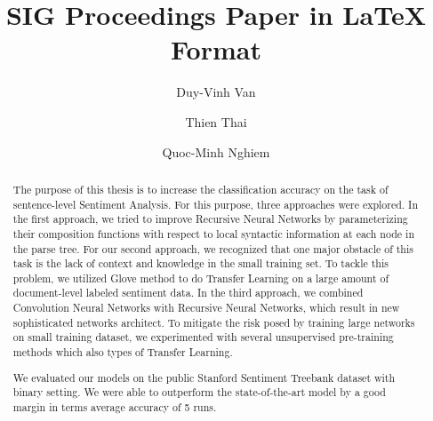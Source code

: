 \documentclass[sigconf]{acmart}
\begin{document}
\title{SIG Proceedings Paper in LaTeX Format}

\author{Duy-Vinh Van}

\author{Thien Thai}

\author{Quoc-Minh Nghiem}

\renewcommand{\shortauthors}{B. Trovato et al.}


\begin{abstract}
The purpose of this thesis is to increase the classification accuracy on the task of sentence-level Sentiment Analysis.
For this purpose, three approaches were explored.
In the first approach, we tried to improve Recursive Neural Networks by parameterizing their composition functions with respect to local syntactic information at each node in the parse tree.
For our second approach, we recognized that one major obstacle of this task is the lack of context and knowledge in the small training set.
To tackle this problem, we utilized Glove method to do Transfer Learning on a large amount of document-level labeled sentiment data.
In the third approach, we combined Convolution Neural Networks with Recursive Neural Networks, which result in new sophisticated networks architect.
To mitigate the risk posed by training large networks on small training dataset, we experimented with several unsupervised pre-training methods which also types of Transfer Learning.

We evaluated our models on the public Stanford Sentiment Treebank dataset with binary setting.
We were able to outperform the state-of-the-art model by a good margin in terms average accuracy of 5 runs.

\end{abstract}
\end{document}
